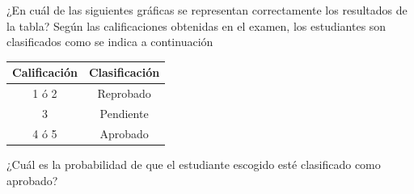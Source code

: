 \documentclass[10pt,letterpaper,addpoints]{exam}
\begin{document}
\begin{multicols}{2}
\begin{questions}
\begin{oneparchoices}
\end{oneparchoices}
 \question \label{quest01} ¿En cuál de las siguientes gráficas se representan correctamente los resultados de la tabla?
\question \label{quest02} Según las calificaciones obtenidas en el examen, los estudiantes son clasificados como se indica a continuación
\begin{center}
\begin{tabular}{|c|c|}
\hline 
\textbf{Calificación} & Clasificación \\ 
\hline 
1 ó 2 & Reprobado \\ 
\hline 
3 & Pendiente \\ 
\hline 
4 ó 5 & Aprobado \\ 
\hline 
\end{tabular} 
\end{center}
¿Cuál es la probabilidad de que el estudiante escogido esté clasificado como aprobado?


\end{questions}
\end{multicols}
\end{document}
